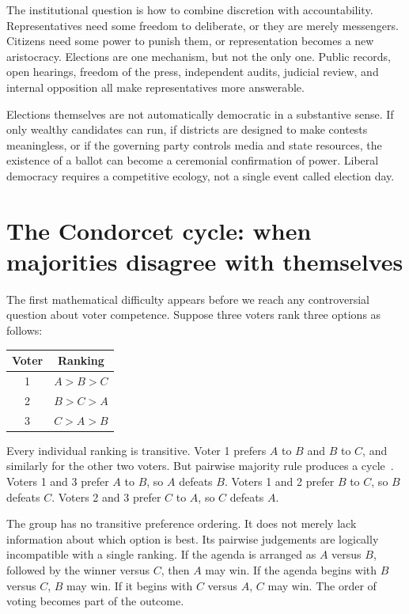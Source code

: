 ﻿\documentclass[12pt,a4paper]{book}
\begin{document}
The institutional question is how to combine discretion with accountability.
Representatives need some freedom to deliberate, or they are merely
messengers.  Citizens need some power to punish them, or representation
becomes a new aristocracy.  Elections are one mechanism, but not the only
one.  Public records, open hearings, freedom of the press, independent
audits, judicial review, and internal opposition all make representatives
more answerable.

Elections themselves are not automatically democratic in a substantive
sense.  If only wealthy candidates can run, if districts are designed to
make contests meaningless, or if the governing party controls media and
state resources, the existence of a ballot can become a ceremonial
confirmation of power.  Liberal democracy requires a competitive ecology,
not a single event called election day.

\section{The Condorcet cycle: when majorities disagree with themselves}

The first mathematical difficulty appears before we reach any controversial
question about voter competence.  Suppose three voters rank three options
as follows:

\begin{center}
\begin{tabular}{c|c}
Voter & Ranking \\
\hline
1 & $A \mathrel{>} B \mathrel{>} C$ \\
2 & $B \mathrel{>} C \mathrel{>} A$ \\
3 & $C \mathrel{>} A \mathrel{>} B$
\end{tabular}
\end{center}

Every individual ranking is transitive.  Voter 1 prefers $A$ to $B$ and
$B$ to $C$, and similarly for the other two voters.  But pairwise majority
rule produces a cycle~\cite{Condorcet1785}.  Voters 1 and 3 prefer $A$ to $B$, so $A$ defeats
$B$.  Voters 1 and 2 prefer $B$ to $C$, so $B$ defeats $C$.  Voters 2 and
3 prefer $C$ to $A$, so $C$ defeats $A$.

The group has no transitive preference ordering.  It does not merely lack
information about which option is best.  Its pairwise judgements are
logically incompatible with a single ranking.  If the agenda is arranged as
$A$ versus $B$, followed by the winner versus $C$, then $A$ may win.  If the
agenda begins with $B$ versus $C$, $B$ may win.  If it begins with $C$ versus
$A$, $C$ may win.  The order of voting becomes part of the outcome.
\end{document}
